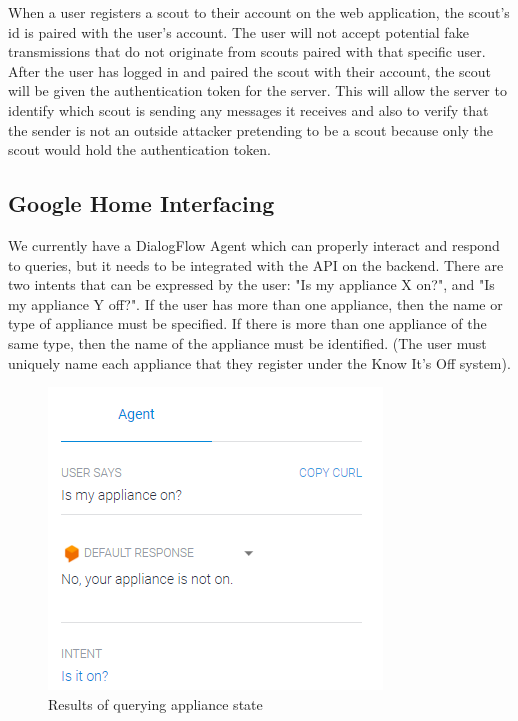 \documentclass[onecolumn, draftclsnofoot,10pt, compsoc]{IEEEtran}
\begin{document}
When a user registers a scout to their account on the web application, the scout's id is paired with the user's account. The user will not accept potential fake transmissions that do not originate from scouts paired with that specific user. After the user has logged in and paired the scout with their account, the scout will be given the authentication token for the server. This will allow the server to identify which scout is sending any messages it receives and also to verify that the sender is not an outside attacker pretending to be a scout because only the scout would hold the authentication token. 

\subsection{Google Home Interfacing}

We currently have a DialogFlow Agent which can properly interact and respond to queries, but it needs to be integrated with the API on the backend. There are two intents that can be expressed by the user: "Is my appliance X on?", and "Is my appliance Y off?". If the user has more than one appliance, then the name or type of appliance must be specified. If there is more than one appliance of the same type, then the name of the appliance must be identified. (The user must uniquely name each appliance that they register under the Know It's Off system).

\begin{figure}
    \centering
    \includegraphics{applianceOff.PNG}
    \caption{Results of querying appliance state}
\end{figure}
\end{document}
